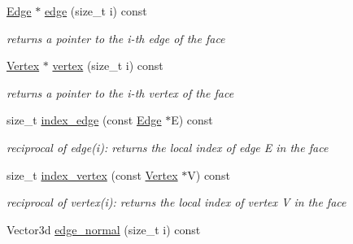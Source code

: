 \begin{DoxyCompactItemize}
\mbox{\label{classHArDCore3D_1_1Face_a93dd83df13314df283be122c36b93c29}} 
\hyperlink{classHArDCore3D_1_1Edge}{Edge} $\ast$ \hyperlink{classHArDCore3D_1_1Face_a93dd83df13314df283be122c36b93c29}{edge} (size\+\_\+t i) const
\begin{DoxyCompactList}\small\item\em returns a pointer to the i-\/th edge of the face \end{DoxyCompactList}\item 
\mbox{\label{classHArDCore3D_1_1Face_a63c8254509d075b402e1ce7393efd70c}} 
\hyperlink{classHArDCore3D_1_1Vertex}{Vertex} $\ast$ \hyperlink{classHArDCore3D_1_1Face_a63c8254509d075b402e1ce7393efd70c}{vertex} (size\+\_\+t i) const
\begin{DoxyCompactList}\small\item\em returns a pointer to the i-\/th vertex of the face \end{DoxyCompactList}\item 
\mbox{\label{classHArDCore3D_1_1Face_a9fafed8814ff199fbbe5995ff4de3067}} 
size\+\_\+t \hyperlink{classHArDCore3D_1_1Face_a9fafed8814ff199fbbe5995ff4de3067}{index\+\_\+edge} (const \hyperlink{classHArDCore3D_1_1Edge}{Edge} $\ast$E) const
\begin{DoxyCompactList}\small\item\em reciprocal of edge(i)\+: returns the local index of edge E in the face \end{DoxyCompactList}\item 
\mbox{\label{classHArDCore3D_1_1Face_abecb40cdeec22fee088921e66aa86800}} 
size\+\_\+t \hyperlink{classHArDCore3D_1_1Face_abecb40cdeec22fee088921e66aa86800}{index\+\_\+vertex} (const \hyperlink{classHArDCore3D_1_1Vertex}{Vertex} $\ast$V) const
\begin{DoxyCompactList}\small\item\em reciprocal of vertex(i)\+: returns the local index of vertex V in the face \end{DoxyCompactList}\item 
\mbox{\label{classHArDCore3D_1_1Face_a8cf04b618dccb40a61ee8144edd9610e}} 
Vector3d \hyperlink{classHArDCore3D_1_1Face_a8cf04b618dccb40a61ee8144edd9610e}{edge\+\_\+normal} (size\+\_\+t i) const

\end{DoxyCompactItemize}
